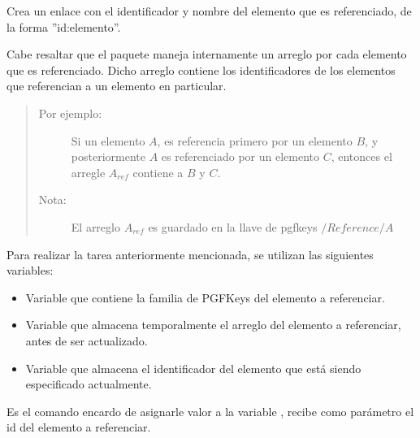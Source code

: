 {\bigskip\bf{}} Crea un enlace con el identificador y nombre del elemento que es referenciado, de la forma ''id:elemento''.
    \begin{code}
    \end{code}

\bigskip\noindent Cabe resaltar que el paquete maneja internamente un arreglo por cada elemento que es referenciado. Dicho arreglo contiene los identificadores de los elementos que referencian a un elemento en particular.

    \begin{quote}
    \begin{description}
        \item[Por ejemplo:] Si un elemento $A$, es referencia primero por un elemento $B$, y posteriormente $A$ es referenciado por un elemento $C$, entonces el arregle $A_{ref}$ contiene a $B$ y $C$.\\
        
        \item[Nota:] El arreglo $A_{ref}$ es guardado en la llave de pgfkeys $/Reference/A$\\
    \end{description}
    \end{quote}

\noindent Para realizar la tarea anteriormente mencionada, se utilizan las siguientes variables:

    \begin{itemize}
        \item {\bf{}} Variable que contiene la familia de PGFKeys del elemento a referenciar. 
        
        \item {\bf{}} Variable que almacena temporalmente el arreglo del elemento a referenciar, antes de ser actualizado.

        \item {} Variable que almacena el identificador del elemento que está siendo especificado actualmente.
    \end{itemize}
        
 Es el comando encardo de asignarle valor a la variable , recibe como parámetro el id del elemento a referenciar.

    \begin{code}
    \end{code}
        
